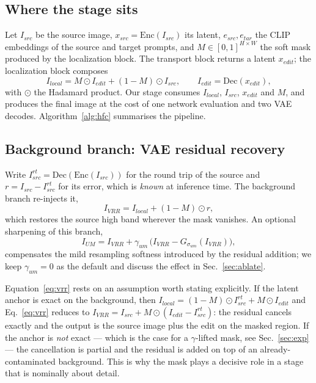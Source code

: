 \documentclass[10pt,twocolumn,letterpaper]{article}
\newcommand{\Dec}{\mathrm{Dec}}
\newcommand{\Enc}{\mathrm{Enc}}
\begin{document}
\subsection{Where the stage sits}
\label{sec:context}
Let $I_{src}$ be the source image, $x_{src}=\Enc(I_{src})$ its latent,
$e_{src},e_{tar}$ the CLIP~\cite{clip} embeddings of the source and target
prompts, and $M\in[0,1]^{H\times W}$ the soft mask produced by the localization
block. The transport block returns a latent $x_{edit}$; the localization block
composes
\begin{equation}
  I_{local} = M\odot I_{edit} + (1-M)\odot I_{src},
  \qquad I_{edit}=\Dec(x_{edit}),
  \label{eq:local}
\end{equation}
with $\odot$ the Hadamard product. Our stage consumes $I_{local}$, $I_{src}$,
$x_{edit}$ and $M$, and produces the final image at the cost of one network
evaluation and two VAE decodes. Algorithm~\ref{alg:hfc} summarises the pipeline.

\subsection{Background branch: VAE residual recovery}
\label{sec:bg}

Write $I^{rt}_{src}=\Dec(\Enc(I_{src}))$ for the round trip of the source and
$r=I_{src}-I^{rt}_{src}$ for its error, which is \emph{known} at inference time.
The background branch re-injects it,
\begin{equation}
  I_{VRR} = I_{local} + (1-M)\odot r ,
  \label{eq:vrr}
\end{equation}
which restores the source high band wherever the mask vanishes. An optional
sharpening of this branch,
\begin{equation}
  I_{UM} = I_{VRR} + \gamma_{um}\,\bigl(I_{VRR}-G_{\sigma_{um}}(I_{VRR})\bigr),
  \label{eq:um}
\end{equation}
compensates the mild resampling softness introduced by the residual addition; we
keep $\gamma_{um}=0$ as the default and discuss the effect in
Sec.~\ref{sec:ablate}.

Equation~\eqref{eq:vrr} rests on an assumption worth stating explicitly. If the
latent anchor is exact on the background, then $I_{local}=(1-M)\odot I^{rt}_{src}
+M\odot I_{edit}$ and Eq.~\eqref{eq:vrr} reduces to
$I_{VRR}=I_{src}+M\odot(I_{edit}-I^{rt}_{src})$: the residual cancels exactly and
the output is the source image plus the edit on the masked region. If the anchor
is \emph{not} exact --- which is the case for a $\gamma$-lifted mask, see
Sec.~\ref{sec:exp} --- the cancellation is partial and the residual is added on
top of an already-contaminated background. This is why the mask plays a decisive
role in a stage that is nominally about detail.
\end{document}
